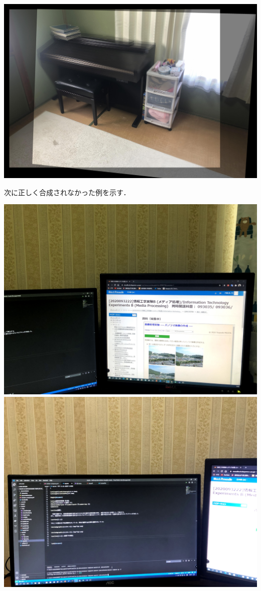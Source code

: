 \documentclass[11pt]{jarticle}
\begin{document}
\includegraphics[scale=.11]{./img/pianoout.jpg}

次に正しく合成されなかった例を示す．


\includegraphics[scale=.055]{./img/desktop0.JPG}
\includegraphics[scale=.055]{./img/desktop1.JPG}
\end{document}
